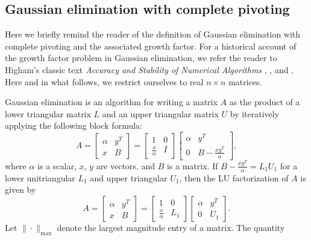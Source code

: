 \documentclass[reqno]{amsart}
\numberwithin{equation}{section}
\begin{document}
\subsection{Gaussian elimination with complete pivoting}

Here we briefly remind the reader of the definition of Gaussian elimination with complete pivoting and the associated growth factor. For a historical account of the growth factor problem in Gaussian elimination, we refer the reader to Higham's classic text \emph{Accuracy and Stability of Numerical Algorithms} \cite[Chapter 9]{higham2002accuracy}, \cite[Section 1.1]{edelman2024some}, and \cite{urschel2025numerical}. Here and in what follows, we restrict ourselves to real $n \times n$ matrices.

Gaussian elimination is an algorithm for writing a matrix $A$ as the product of a lower triangular matrix $L$ and an upper triangular matrix $U$ by iteratively applying the following block formula:
\begin{equation}\label{ge}
A = \begin{bmatrix}
\alpha & y^T \\
x & B
\end{bmatrix} = \begin{bmatrix}1 & 0 \\ \frac{x}{\alpha} & I \end{bmatrix}  \begin{bmatrix} \alpha & y^T \\ 0 & B - \frac{xy^T}{\alpha} \end{bmatrix},
\end{equation}
where $\alpha$ is a scalar, $x$, $y$ are vectors, and $B$ is a matrix. If $B - \frac{xy^T}{\alpha} = L_1 U_1$ for a lower unitriangular $L_1$ and upper triangular $U_1$, then the LU factorization of $A$ is given by
\begin{equation}A = \begin{bmatrix}
\alpha & y^T \\
x & B
\end{bmatrix} = \begin{bmatrix}1 & 0 \\ \frac{x}{\alpha} & L_1 \end{bmatrix}  \begin{bmatrix} \alpha & y^T \\ 0 & U_1 \end{bmatrix}.\end{equation}
Let $\|\cdot\|_{\max}$ denote the largest magnitude entry of a matrix. The quantity 
\end{document}
